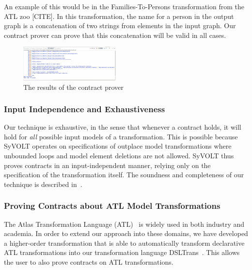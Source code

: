  An example of this
would be in the Families-To-Persons transformation from the ATL zoo [CITE]. In
this transformation, the name for a person in the output graph is a
concatenation of two strings  from elements in the input
graph. Our contract prover can prove that this concatenation will be valid in
all cases.

\begin{figure}
\centering
\includegraphics[width=0.45\textwidth]{figures/output}
\caption{The results of the contract prover}
\label{fig:output}
\end{figure}

\subsubsection{Input Independence and Exhaustiveness} 

Our technique is exhaustive, in the sense that whenever a contract holds, it
will hold for \emph{all} possible input models of a transformation. This is
possible because SyVOLT operates on specifications of outplace model transformations where unbounded loops and model element
deletions are not allowed. SyVOLT thus proves contracts in an input-independent
manner, relying only on the specification of the transformation itself. The
soundness and completeness of our technique is described in~\cite{Lucio2014}.

\subsubsection{Proving Contracts about ATL Model Transformations}

 The Atlas
Transformation Language (ATL)~\cite{atlTool} is widely used in both industry and
academia. In order to extend our approach into these domains, we have developed a higher-order
transformation that is able to automatically transform declarative ATL
transformations into our transformation language DSLTrans~\cite{Oakes}. This
allows the user to also prove contracts on ATL transformations.

